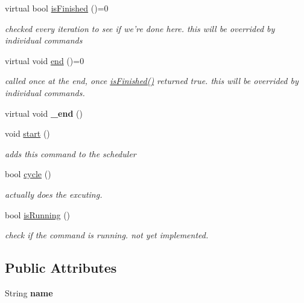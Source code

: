 \begin{DoxyCompactItemize}
\item 
virtual bool \hyperlink{classCommand_a9aa704d5f9d98f510a79e645701dc72a}{is\-Finished} ()=0
\begin{DoxyCompactList}\small\item\em checked every iteration to see if we're done here. this will be overrided by individual commands \end{DoxyCompactList}\item 
\hypertarget{classCommand_abed8b7871ba1078bc10056cac5b471be}{virtual void \hyperlink{classCommand_abed8b7871ba1078bc10056cac5b471be}{end} ()=0}\label{classCommand_abed8b7871ba1078bc10056cac5b471be}

\begin{DoxyCompactList}\small\item\em called once at the end, once \hyperlink{classCommand_a9aa704d5f9d98f510a79e645701dc72a}{is\-Finished()} returned true. this will be overrided by individual commands. \end{DoxyCompactList}\item 
\hypertarget{classCommand_a9173c74652cb69c8807170bf16151ae2}{virtual void {\bfseries \-\_\-end} ()}\label{classCommand_a9173c74652cb69c8807170bf16151ae2}

\item 
\hypertarget{classCommand_aef139180669b92534dd05a89323fb82f}{void \hyperlink{classCommand_aef139180669b92534dd05a89323fb82f}{start} ()}\label{classCommand_aef139180669b92534dd05a89323fb82f}

\begin{DoxyCompactList}\small\item\em adds this command to the scheduler \end{DoxyCompactList}\item 
bool \hyperlink{classCommand_a93e75689d86c0a8675c1f769f721d646}{cycle} ()
\begin{DoxyCompactList}\small\item\em actually does the excuting. \end{DoxyCompactList}\item 
bool \hyperlink{classCommand_a0252c920dd7114c29ef04526cfd0f39a}{is\-Running} ()
\begin{DoxyCompactList}\small\item\em check if the command is running. not yet implemented. \end{DoxyCompactList}\end{DoxyCompactItemize}
\subsection*{Public Attributes}
\begin{DoxyCompactItemize}
\item 
\hypertarget{classCommand_a19f7ad73ca8599ad47f9b7bcccc52610}{String {\bfseries name}}\label{classCommand_a19f7ad73ca8599ad47f9b7bcccc52610}

\end{DoxyCompactItemize}


